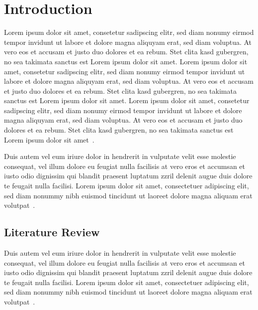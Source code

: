 \chapter{Introduction}
Lorem ipsum dolor sit amet, consetetur sadipscing elitr,  sed diam nonumy eirmod
tempor invidunt ut labore et dolore magna aliquyam erat, sed diam voluptua. At
vero eos et accusam et justo duo dolores et ea rebum. Stet clita kasd gubergren,
no sea takimata sanctus est Lorem ipsum dolor sit amet. Lorem ipsum dolor sit
amet, consetetur sadipscing elitr,  sed diam nonumy eirmod tempor invidunt ut
labore et dolore magna aliquyam erat, sed diam voluptua. At vero eos et accusam
et justo duo dolores et ea rebum. Stet clita kasd gubergren, no sea takimata
sanctus est Lorem ipsum dolor sit amet. Lorem ipsum dolor sit amet, consetetur
sadipscing elitr,  sed diam nonumy eirmod tempor invidunt ut labore et dolore
magna aliquyam erat, sed diam voluptua. At vero eos et accusam et justo duo
dolores et ea rebum. Stet clita kasd gubergren, no sea takimata sanctus est
Lorem ipsum dolor sit amet~\cite{aror:eseoa}.

Duis autem vel eum iriure dolor in hendrerit in vulputate velit esse molestie
consequat, vel illum dolore eu feugiat nulla facilisis at vero eros et accumsan
et iusto odio dignissim qui blandit praesent luptatum zzril delenit augue duis
dolore te feugait nulla facilisi. Lorem ipsum dolor sit amet, consectetuer
adipiscing elit, sed diam nonummy nibh euismod tincidunt ut laoreet dolore
magna aliquam erat volutpat~\cite{aror:alits}.

\section{Literature Review}Duis autem vel eum iriure dolor in hendrerit in vulputate velit esse molestie
consequat, vel illum dolore eu feugiat nulla facilisis at vero eros et accumsan
et iusto odio dignissim qui blandit praesent luptatum zzril delenit augue duis
dolore te feugait nulla facilisi. Lorem ipsum dolor sit amet, consectetuer
adipiscing elit, sed diam nonummy nibh euismod tincidunt ut laoreet dolore
magna aliquam erat volutpat~\cite{aror:alits}.